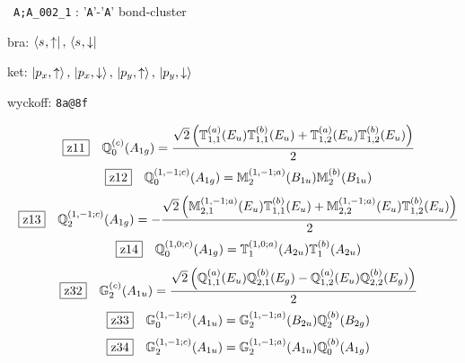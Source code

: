 \documentclass[fleqn,10pt,landscape]{jsarticle}
\begin{document}
\noindent\textbullet\, \texttt{A;A_002_1} : '\texttt{A}'-'\texttt{A}' bond-cluster

\noindent\quad * bra: $\bra{s_{},\uparrow},\, \bra{s_{},\downarrow}$

\noindent\quad * ket: $\ket{p_{x},\uparrow},\, \ket{p_{x},\downarrow},\, \ket{p_{y},\uparrow},\, \ket{p_{y},\downarrow}$

\noindent\quad * wyckoff: \texttt{8a@8f}

\begin{dmath*}
\hspace*{3mm}\fbox{z11}\quad \mathbb{Q}_{0}^{(c)}(A_{1g})=\frac{\sqrt{2} \left(\mathbb{T}_{1,1}^{(a)}(E_{u}) \mathbb{T}_{1,1}^{(b)}(E_{u}) + \mathbb{T}_{1,2}^{(a)}(E_{u}) \mathbb{T}_{1,2}^{(b)}(E_{u})\right)}{2}
\end{dmath*}
\begin{dmath*}
\hspace*{3mm}\fbox{z12}\quad \mathbb{Q}_{0}^{(1,-1;c)}(A_{1g})=\mathbb{M}_{2}^{(1,-1;a)}(B_{1u}) \mathbb{M}_{2}^{(b)}(B_{1u})
\end{dmath*}
\begin{dmath*}
\hspace*{3mm}\fbox{z13}\quad \mathbb{Q}_{2}^{(1,-1;c)}(A_{1g})=- \frac{\sqrt{2} \left(\mathbb{M}_{2,1}^{(1,-1;a)}(E_{u}) \mathbb{T}_{1,1}^{(b)}(E_{u}) + \mathbb{M}_{2,2}^{(1,-1;a)}(E_{u}) \mathbb{T}_{1,2}^{(b)}(E_{u})\right)}{2}
\end{dmath*}
\begin{dmath*}
\hspace*{3mm}\fbox{z14}\quad \mathbb{Q}_{0}^{(1,0;c)}(A_{1g})=\mathbb{T}_{1}^{(1,0;a)}(A_{2u}) \mathbb{T}_{1}^{(b)}(A_{2u})
\end{dmath*}
\begin{dmath*}
\hspace*{3mm}\fbox{z32}\quad \mathbb{G}_{2}^{(c)}(A_{1u})=\frac{\sqrt{2} \left(\mathbb{Q}_{1,1}^{(a)}(E_{u}) \mathbb{Q}_{2,1}^{(b)}(E_{g}) - \mathbb{Q}_{1,2}^{(a)}(E_{u}) \mathbb{Q}_{2,2}^{(b)}(E_{g})\right)}{2}
\end{dmath*}
\begin{dmath*}
\hspace*{3mm}\fbox{z33}\quad \mathbb{G}_{0}^{(1,-1;c)}(A_{1u})=\mathbb{G}_{2}^{(1,-1;a)}(B_{2u}) \mathbb{Q}_{2}^{(b)}(B_{2g})
\end{dmath*}
\begin{dmath*}
\hspace*{3mm}\fbox{z34}\quad \mathbb{G}_{2}^{(1,-1;c)}(A_{1u})=\mathbb{G}_{2}^{(1,-1;a)}(A_{1u}) \mathbb{Q}_{0}^{(b)}(A_{1g})
\end{dmath*}
\end{document}
